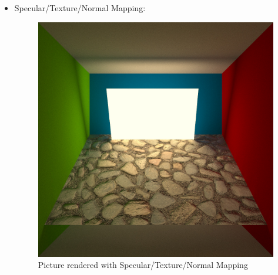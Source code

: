 \documentclass[11pt,a4paper]{article}
\begin{document}
\begin{itemize}
\item
Specular/Texture/Normal Mapping:\\
\begin{figure}[h]
\begin{center}
\includegraphics[scale=0.2]{images/bumbmapped1000spp}
\caption[Picture showing Specular/Texture/Normal Mapping]{Picture rendered with Specular/Texture/Normal Mapping}
\label{fig:5}
\end{center}
\end{figure}

\end{itemize}



\end{document}
